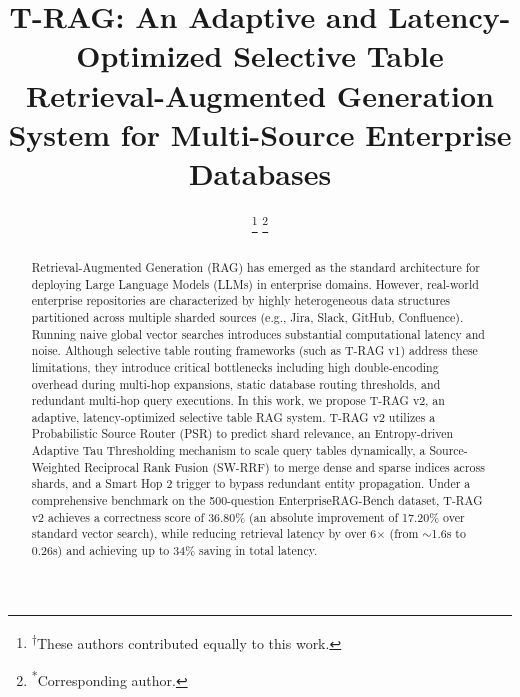 \documentclass[conference]{IEEEtran}
\begin{document}
\title{T-RAG: An Adaptive and Latency-Optimized Selective Table Retrieval-Augmented Generation System for Multi-Source Enterprise Databases}

\author{
    \thanks{\textsuperscript{$\dagger$}These authors contributed equally to this work.}
    \thanks{\textsuperscript{*}Corresponding author.}
}

\maketitle

\begin{abstract}
Retrieval-Augmented Generation (RAG) has emerged as the standard architecture for deploying Large Language Models (LLMs) in enterprise domains. However, real-world enterprise repositories are characterized by highly heterogeneous data structures partitioned across multiple sharded sources (e.g., Jira, Slack, GitHub, Confluence). Running naive global vector searches introduces substantial computational latency and noise. Although selective table routing frameworks (such as T-RAG v1) address these limitations, they introduce critical bottlenecks including high double-encoding overhead during multi-hop expansions, static database routing thresholds, and redundant multi-hop query executions. In this work, we propose T-RAG v2, an adaptive, latency-optimized selective table RAG system. T-RAG v2 utilizes a Probabilistic Source Router (PSR) to predict shard relevance, an Entropy-driven Adaptive Tau Thresholding mechanism to scale query tables dynamically, a Source-Weighted Reciprocal Rank Fusion (SW-RRF) to merge dense and sparse indices across shards, and a Smart Hop 2 trigger to bypass redundant entity propagation. Under a comprehensive benchmark on the 500-question EnterpriseRAG-Bench dataset, T-RAG v2 achieves a correctness score of 36.80\% (an absolute improvement of 17.20\% over standard vector search), while reducing retrieval latency by over 6$\times$ (from $\sim$1.6s to 0.26s) and achieving up to 34\% saving in total latency.
\end{abstract}
\end{document}
